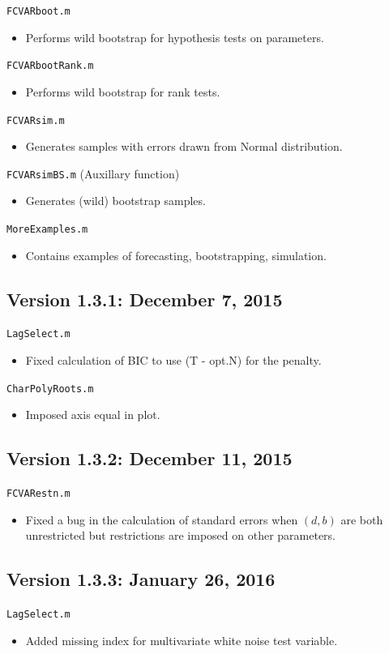\documentclass[10pt]{article}
\begin{document}
\noindent \verb|FCVARboot.m|
\begin{itemize}
\item Performs wild bootstrap for hypothesis tests on parameters.
\end{itemize}
\noindent \verb|FCVARbootRank.m|
\begin{itemize}
\item Performs wild bootstrap for rank tests.
\end{itemize}
\noindent \verb|FCVARsim.m|
\begin{itemize}
\item Generates samples with errors drawn from Normal distribution. 
\end{itemize}
\noindent \verb|FCVARsimBS.m| (Auxillary function)
\begin{itemize}
\item Generates (wild) bootstrap samples.
\end{itemize}
\noindent \verb|MoreExamples.m|
\begin{itemize}
\item Contains examples of forecasting, bootstrapping, simulation.
\end{itemize}


\subsection{Version 1.3.1: December 7, 2015}
\noindent \verb|LagSelect.m|
\begin{itemize}
\item Fixed calculation of BIC to use (T - opt.N) for the penalty.
\end{itemize}
\noindent \verb|CharPolyRoots.m|
\begin{itemize}
\item Imposed axis equal in plot.
\end{itemize}


\subsection{Version 1.3.2: December 11, 2015}
\noindent \verb|FCVARestn.m|
\begin{itemize}
\item Fixed a bug in the calculation of standard errors when $(d,b)$ are both unrestricted but restrictions are imposed on other parameters.
\end{itemize}


\subsection{Version 1.3.3: January 26, 2016}
\noindent \verb|LagSelect.m|
\begin{itemize}
\item Added missing index for multivariate white noise test variable.
\end{itemize}
\end{document}
